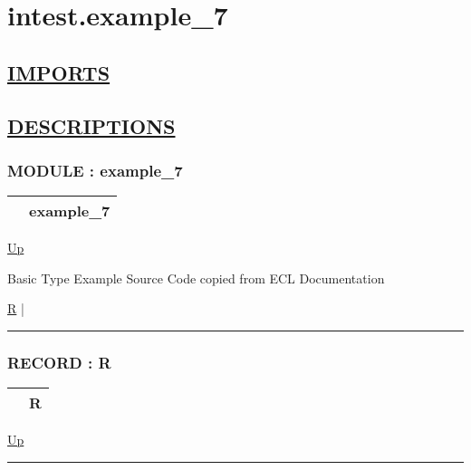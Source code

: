 \chapter*{intest.example\_7}
\hypertarget{ecldoc:toc:intest.example_7}{}

\section*{\underline{IMPORTS}}

\section*{\underline{DESCRIPTIONS}}
\subsection*{MODULE : example\_7}
\hypertarget{ecldoc:intest.example_7}{}

{\renewcommand{\arraystretch}{1.5}
\begin{tabularx}{\textwidth}{|>{\raggedright\arraybackslash}l|X|}
\hline
\hspace{0pt} & example\_7 \\
\hline
\end{tabularx}
}

\hyperlink{ecldoc:toc:intest}{Up}

\par
Basic Type Example Source Code copied from ECL Documentation


\hyperlink{ecldoc:intest.example_7.r}{R}  |

\rule{\textwidth}{0.4pt}

\subsection*{RECORD : R}
\hypertarget{ecldoc:intest.example_7.r}{}

{\renewcommand{\arraystretch}{1.5}
\begin{tabularx}{\textwidth}{|>{\raggedright\arraybackslash}l|X|}
\hline
\hspace{0pt} & R \\
\hline
\end{tabularx}
}

\hyperlink{ecldoc:intest.example_7}{Up}

\par


\rule{\textwidth}{0.4pt}


